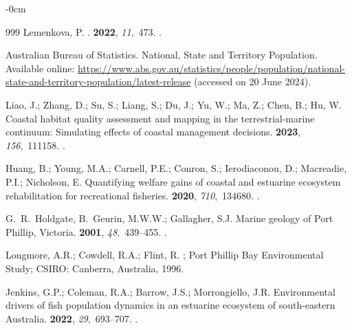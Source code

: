 \documentclass[jmse,article,accept,pdftex,oneauthor]{Definitions/mdpi}
\begin{document}
\begin{adjustwidth}{-\extralength}{0cm}
\begin{thebibliography}{999}
Lemenkova, P.
.
 {\bf 2022}, {\em
  11},~473.
.

{Australian Bureau of Statistics}.
\newblock National, State and Territory Population. 
\newblock Available online: \url{https://www.abs.gov.au/statistics/people/population/national-state-and-territory-population/latest-release} (accessed on 20 June 2024). %

Liao, J.; Zhang, D.; Su, S.; Liang, S.; Du, J.; Yu, W.; Ma, Z.; Chen, B.; Hu,
  W.
\newblock Coastal habitat quality assessment and mapping in the
  terrestrial-marine continuum: Simulating effects of coastal management
  decisions.
 {\bf 2023}, {\em 156},~111158.
.

Huang, B.; Young, M.A.; Carnell, P.E.; Conron, S.; Ierodiaconou, D.; Macreadie,
  P.I.; Nicholson, E.
\newblock Quantifying welfare gains of coastal and estuarine ecosystem
  rehabilitation for recreational fisheries.
 {\bf 2020}, {\em 710},~134680.
.

G.~R.~Holdgate, B.~Geurin, M.W.W.; Gallagher, S.J.
\newblock Marine geology of Port Phillip, Victoria.
 {\bf 2001}, {\em
  48},~439--455.
.

Longmore, A.R.; Cowdell, R.A.; Flint, R.
; Port
  Phillip Bay Environmental Study; CSIRO: Canberra, Australia,  1996.

Jenkins, G.P.; Coleman, R.A.; Barrow, J.S.; Morrongiello, J.R.
\newblock Environmental drivers of fish population dynamics in an estuarine
  ecosystem of south-eastern Australia.
 {\bf 2022}, {\em
  29},~693--707.
.


\end{thebibliography}
\end{adjustwidth}
\end{document}
